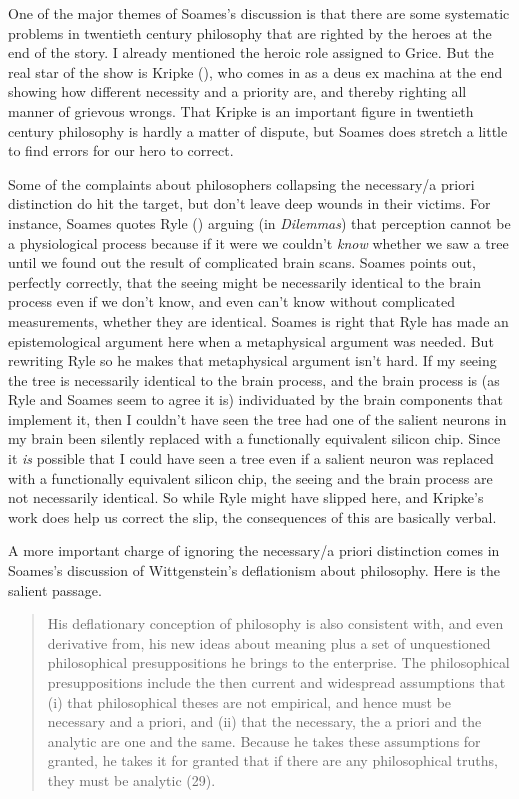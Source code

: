 \documentclass[
  10pt,
  letterpaper,
  DIV=11,
  numbers=noendperiod,
  twoside]{scrartcl}
\begin{document}
One of the major themes of Soames's discussion is that there are some
systematic problems in twentieth century philosophy that are righted by
the heroes at the end of the story. I already mentioned the heroic role
assigned to Grice. But the real star of the show is Kripke
(), who comes in as a deus ex machina at
the end showing how different necessity and a priority are, and thereby
righting all manner of grievous wrongs. That Kripke is an important
figure in twentieth century philosophy is hardly a matter of dispute,
but Soames does stretch a little to find errors for our hero to correct.

Some of the complaints about philosophers collapsing the necessary/a
priori distinction do hit the target, but don't leave deep wounds in
their victims. For instance, Soames quotes Ryle
() arguing (in \emph{Dilemmas}) that
perception cannot be a physiological process because if it were we
couldn't \emph{know} whether we saw a tree until we found out the result
of complicated brain scans. Soames points out, perfectly correctly, that
the seeing might be necessarily identical to the brain process even if
we don't know, and even can't know without complicated measurements,
whether they are identical. Soames is right that Ryle has made an
epistemological argument here when a metaphysical argument was needed.
But rewriting Ryle so he makes that metaphysical argument isn't hard. If
my seeing the tree is necessarily identical to the brain process, and
the brain process is (as Ryle and Soames seem to agree it is)
individuated by the brain components that implement it, then I couldn't
have seen the tree had one of the salient neurons in my brain been
silently replaced with a functionally equivalent silicon chip. Since it
\emph{is} possible that I could have seen a tree even if a salient
neuron was replaced with a functionally equivalent silicon chip, the
seeing and the brain process are not necessarily identical. So while
Ryle might have slipped here, and Kripke's work does help us correct the
slip, the consequences of this are basically verbal.

A more important charge of ignoring the necessary/a priori distinction
comes in Soames's discussion of Wittgenstein's deflationism about
philosophy. Here is the salient passage.

\begin{quote}
His deflationary conception of philosophy is also consistent with, and
even derivative from, his new ideas about meaning plus a set of
unquestioned philosophical presuppositions he brings to the enterprise.
The philosophical presuppositions include the then current and
widespread assumptions that (i) that philosophical theses are not
empirical, and hence must be necessary and a priori, and (ii) that the
necessary, the a priori and the analytic are one and the same. Because
he takes these assumptions for granted, he takes it for granted that if
there are any philosophical truths, they must be analytic (29).
\end{quote}
\end{document}
